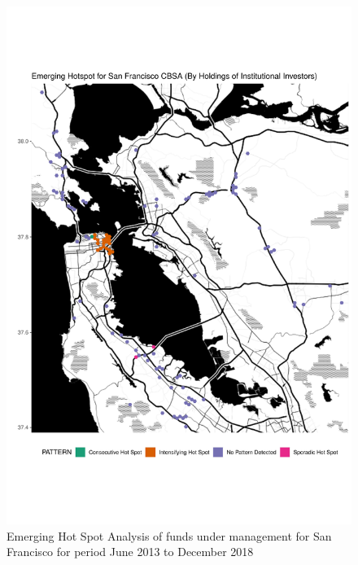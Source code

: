 \begin{figure}
	\centering
	\includegraphics[width=1\linewidth]{Figures/ChapterIV/SF_Money_EH}
	\caption[Emerging Hot Spot Analysis of Funds Under Management for San Francisco CBSA 2013-2018]{Emerging Hot Spot Analysis of funds under management for San Francisco for period June 2013 to December 2018}
	\label{fig:SFnmoneyhotspot}
\end{figure}


